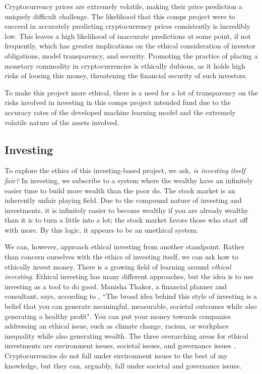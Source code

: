\documentclass[10pt,twocolumn]{article}
\begin{document}
Cryptocurrency prices are extremely volatile, making their price prediction a uniquely difficult challenge. The likelihood that this comps project were to succeed in accurately predicting cryptocurrency prices consistently is incredibly low. This leaves a high likelihood  of inaccurate predictions at some point, if not frequently, which has greater implications on the ethical consideration of investor obligations, model transparency, and security. Promoting the practice of placing a monetary commodity in cryptocurrencies is ethically dubious, as it holds high risks of loosing this money, threatening the financial security of such investors.

To make this project more ethical, there is a need for a lot of transparency on the risks involved in investing in this comps project intended fund due to the accuracy rates of the developed machine learning model and the extremely volatile nature of the assets involved.

\subsection{Investing}

To explore the ethics of this investing-based project, we ask, \textit{is investing itself fair?} In investing, we subscribe to a system where the wealthy have an infinitely easier time to build more wealth than the poor do. The stock market is an inherently unfair playing field. Due to the compound nature of investing and investments, it is infinitely easier to become wealthy if you are already wealthy than it is to turn a little into a lot; the stock market favors those who start off with more. By this logic, it appears to be an unethical system.

We can, however, approach ethical investing from another standpoint. Rather than concern ourselves with the ethics of investing itself, we can ask how to ethically invest money. There is a growing field of learning around \textit{ethical investing}. Ethical investing has many different approaches, but the idea is to use investing as a tool to do good. Manisha Thakor, a financial planner and consultant, says, according to , ``The broad idea behind this style of investing is a belief that you can generate meaningful, measurable, societal outcomes while also generating a healthy profit". You can put your money towards companies addressing an ethical issue, such as climate change, racism, or workplace inequality while also generating wealth. The three overarching areas for ethical investments are environment issues, societal issues, and governance issues \cite{LimitsOfEthicalInvesting}. Cryptocurrencies do not fall under environment issues to the best of my knowledge, but they can, arguably, fall under societal and governance issues.
\end{document}
